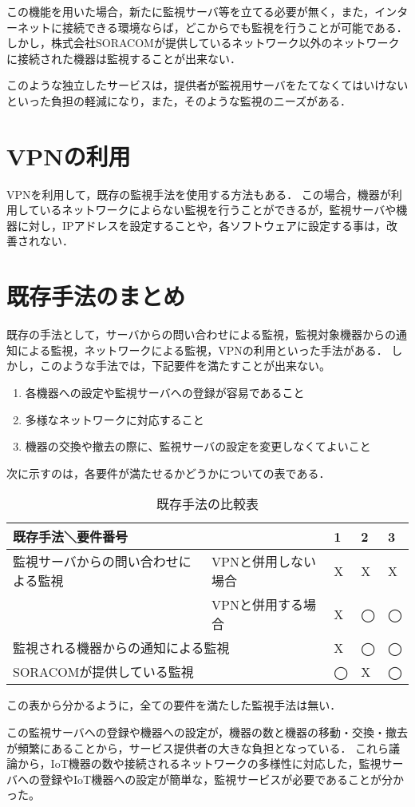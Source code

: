 	この機能を用いた場合，新たに監視サーバ等を立てる必要が無く，また，インターネットに接続できる環境ならば，どこからでも監視を行うことが可能である．
	しかし，株式会社SORACOMが提供しているネットワーク以外のネットワークに接続された機器は監視することが出来ない．

	このような独立したサービスは，提供者が監視用サーバをたてなくてはいけないといった負担の軽減になり，また，そのような監視のニーズがある．

\section{VPNの利用}
	VPNを利用して，既存の監視手法を使用する方法もある．
	この場合，機器が利用しているネットワークによらない監視を行うことができるが，監視サーバや機器に対し，IPアドレスを設定することや，各ソフトウェアに設定する事は，改善されない．

\section{既存手法のまとめ}
	既存の手法として，サーバからの問い合わせによる監視，監視対象機器からの通知による監視，ネットワークによる監視，VPNの利用といった手法がある．
	しかし，このような手法では，下記要件を満たすことが出来ない。
	\begin{enumerate}
		\item 各機器への設定や監視サーバへの登録が容易であること
		\item 多様なネットワークに対応すること
		\item 機器の交換や撤去の際に、監視サーバの設定を変更しなくてよいこと
	\end{enumerate}

	次に示すのは，各要件が満たせるかどうかについての表である．\\
	\begin{table}[htbp]
	\caption{既存手法の比較表}
	\begin{tabular}{|l|l|l|l|l|} \hline
		\multicolumn{2}{|l|}{既存手法＼要件番号} & 1 & 2 & 3 \\ \hline \hline
		監視サーバからの問い合わせによる監視 & VPNと併用しない場合 & X & X & X \\ \cline{2-5}
			& VPNと併用する場合 & X & ◯ & ◯  \\ \hline
		\multicolumn{2}{|l|}{監視される機器からの通知による監視} & X & ◯ & ◯ \\ \hline
		\multicolumn{2}{|l|}{SORACOMが提供している監視} & ◯ & X & ◯ \\ \hline
	\end{tabular}
	\end{table}
	この表から分かるように，全ての要件を満たした監視手法は無い．

	この監視サーバへの登録や機器への設定が，機器の数と機器の移動・交換・撤去が頻繁にあることから，サービス提供者の大きな負担となっている．
	これら議論から，IoT機器の数や接続されるネットワークの多様性に対応した，監視サーバへの登録やIoT機器への設定が簡単な，監視サービスが必要であることが分かった。


